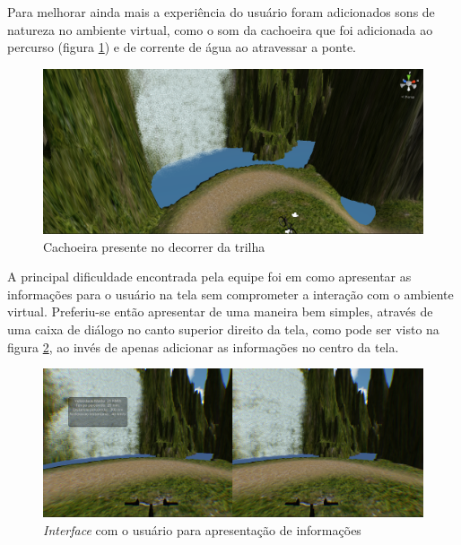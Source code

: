 Para melhorar ainda mais a experiência do usuário foram adicionados sons de natureza no ambiente virtual, como o som da cachoeira que foi adicionada ao percurso (figura \ref{fig:waterFallPosition}) e de corrente de água ao atravessar a ponte.

\begin{figure}[h]
  \centering
  \includegraphics[width=1.0\textwidth]{figuras/waterFallPosition}
  \caption{Cachoeira presente no decorrer da trilha}
  \label{fig:waterFallPosition}
\end{figure}

A principal dificuldade encontrada pela equipe foi em como apresentar as informações para o usuário na tela sem comprometer a interação com o ambiente virtual. Preferiu-se então apresentar de uma maneira bem simples, através de uma caixa de diálogo no canto superior direito da tela, como pode ser visto na figura \ref{fig:improvedInterface}, ao invés de apenas adicionar as informações no centro da tela.


\begin{figure}[h]
  \centering
  \includegraphics[width=1.0\textwidth]{figuras/improvedInterface}
  \caption{\textit{Interface} com o usuário para apresentação de informações}
  \label{fig:improvedInterface}
\end{figure}

